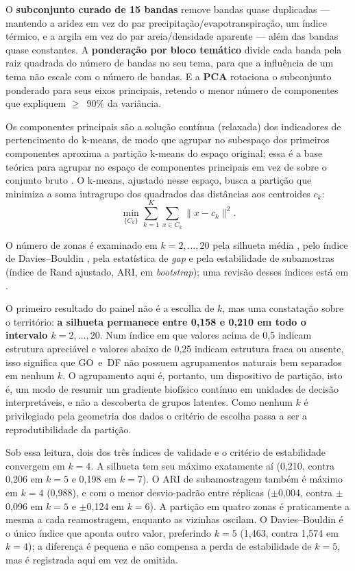 O \textbf{subconjunto curado de 15 bandas} remove bandas quase duplicadas --- mantendo a aridez em vez
do par precipitação/evapotranspiração, um índice térmico, e a argila em vez do par
areia/densidade aparente --- além das bandas quase constantes. A \textbf{ponderação por bloco temático}
divide cada banda pela raiz quadrada do número de bandas no seu tema, para que a influência de um tema não escale
com o número de bandas. E a \textbf{PCA} rotaciona o subconjunto ponderado para seus eixos principais,
retendo o menor número de componentes que expliquem $\geq$~90\% da variância.

Os componentes principais são a solução contínua (relaxada) dos indicadores de pertencimento do k-means,
de modo que agrupar no subespaço dos primeiros componentes aproxima a partição k-means do espaço
original; essa é a base teórica para agrupar no espaço de componentes principais em vez de sobre o
conjunto bruto \citep[Teor.~3.1]{ding_k-means_2004}. O k-means, ajustado nesse espaço, busca a partição que minimiza a soma intragrupo
dos quadrados das distâncias aos centroides $c_k$:
\begin{equation*}
  \min_{\{C_k\}} \sum_{k=1}^{K} \sum_{x \in C_k} \lVert x - c_k \rVert^2.
\end{equation*}

O número de zonas é examinado em $k = 2,\dots,20$ pela silhueta média
\citep[p.~59]{rousseeuw_silhouettes_1987}, pelo índice de Davies--Bouldin \citep{davies_cluster_1979},
pela estatística de \emph{gap} %
e pela estabilidade de subamostras (índice de Rand ajustado, ARI, em \emph{bootstrap}); uma revisão
desses índices está em \citet{ikotun_cluster_2025}.

O primeiro resultado do painel não é a escolha de $k$, mas uma constatação sobre o território:
\textbf{a silhueta permanece entre 0,158 e 0,210 em todo o intervalo $k = 2,\dots,20$}. Num
índice em que valores acima de 0,5 indicam estrutura apreciável e valores abaixo de 0,25 indicam
estrutura fraca ou ausente, isso significa que GO~e~DF não possuem agrupamentos naturais
bem separados em nenhum $k$. O agrupamento aqui é, portanto, um dispositivo de
partição, isto é, um modo de resumir um gradiente biofísico contínuo em unidades de decisão
interpretáveis, e não a descoberta de grupos latentes. Como nenhum $k$ é privilegiado
pela geometria dos dados o critério de escolha passa a ser a reprodutibilidade da partição.

Sob essa leitura, dois dos três índices de validade e o critério de estabilidade convergem em
$k = 4$. A silhueta tem seu máximo exatamente aí (0,210, contra 0,206 em $k=5$ e 0,198 em
$k=7$). O ARI de subamostragem também é máximo em $k=4$ (0,988), e com
o menor desvio-padrão entre réplicas ($\pm$0,004, contra
$\pm$0,096 em $k=5$ e $\pm$0,124 em $k=6$). A partição em quatro zonas é praticamente a mesma a
cada reamostragem, enquanto as vizinhas oscilam. O Davies--Bouldin é o único índice que aponta
outro valor, preferindo $k=5$ (1,463, contra 1,574 em $k=4$); a diferença é pequena e não
compensa a perda de estabilidade de $k=5$, mas é registrada aqui em vez de omitida.

